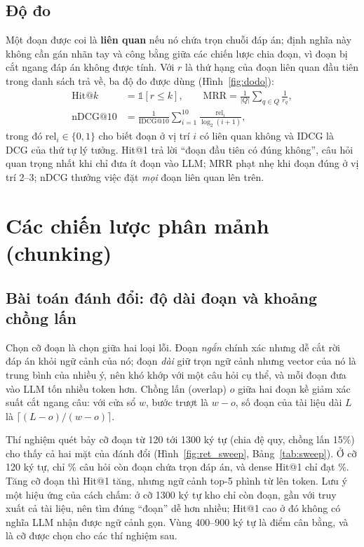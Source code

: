 
\subsection{Độ đo}
Một đoạn được coi là \textbf{liên quan} nếu nó chứa trọn chuỗi đáp án; định nghĩa này không cần gán nhãn tay và
công bằng giữa các chiến lược chia đoạn, vì đoạn bị cắt ngang đáp án không được tính. Với $r$ là thứ hạng của đoạn
liên quan đầu tiên trong danh sách trả về, ba độ đo được dùng (Hình~\ref{fig:dodo}):
\begin{align}
  \text{Hit@}k &= \mathbb{1}[r \le k], \qquad \text{MRR} = \frac{1}{|Q|}\sum_{q \in Q} \frac{1}{r_q},\\
  \text{nDCG@}10 &= \frac{1}{\text{IDCG@}10}\sum_{i=1}^{10}\frac{\text{rel}_i}{\log_2(i+1)},
\end{align}
trong đó $\text{rel}_i \in \{0,1\}$ cho biết đoạn ở vị trí $i$ có liên quan không và IDCG là DCG của thứ tự lý
tưởng. Hit@1 trả lời ``đoạn đầu tiên có đúng không'', câu hỏi quan trọng nhất khi chỉ đưa ít đoạn vào LLM; MRR
phạt nhẹ khi đoạn đúng ở vị trí 2--3; nDCG thưởng việc đặt \emph{mọi} đoạn liên quan lên trên.



\section{Các chiến lược phân mảnh (chunking)}\label{sec:chunking}
\subsection{Bài toán đánh đổi: độ dài đoạn và khoảng chồng lấn}
Chọn cỡ đoạn là chọn giữa hai loại lỗi. Đoạn \emph{ngắn} chính xác nhưng dễ cắt rời đáp án khỏi ngữ cảnh của nó;
đoạn \emph{dài} giữ trọn ngữ cảnh nhưng vector của nó là trung bình của nhiều ý, nên khó khớp với một câu hỏi cụ
thể, và mỗi đoạn đưa vào LLM tốn nhiều token hơn. Chồng lấn (overlap) $o$ giữa hai đoạn kề giảm xác suất cắt
ngang câu: với cửa sổ $w$, bước trượt là $w-o$, số đoạn của tài liệu dài $L$ là $\lceil (L-o)/(w-o) \rceil$.

Thí nghiệm quét bảy cỡ đoạn từ 120 tới 1300 ký tự (chia đệ quy, chồng lấn 15\%) cho thấy cả hai mặt của đánh đổi
(Hình~\ref{fig:ret_sweep}, Bảng~\ref{tab:sweep}). Ở cỡ 120 ký tự, chỉ
\% câu hỏi còn đoạn chứa trọn đáp án, và dense Hit@1 chỉ đạt
\%. Tăng cỡ đoạn thì Hit@1 tăng, nhưng ngữ cảnh top-5 phình từ
 lên  token. Lưu ý một hiệu ứng
của cách chấm: ở cỡ 1300 ký tự kho chỉ còn  đoạn, gần với truy xuất cả tài liệu,
nên tìm đúng ``đoạn'' dễ hơn nhiều; Hit@1 cao ở đó không có nghĩa LLM nhận được ngữ cảnh gọn. Vùng 400--900 ký
tự là điểm cân bằng, và là cỡ được chọn cho các thí nghiệm sau.

